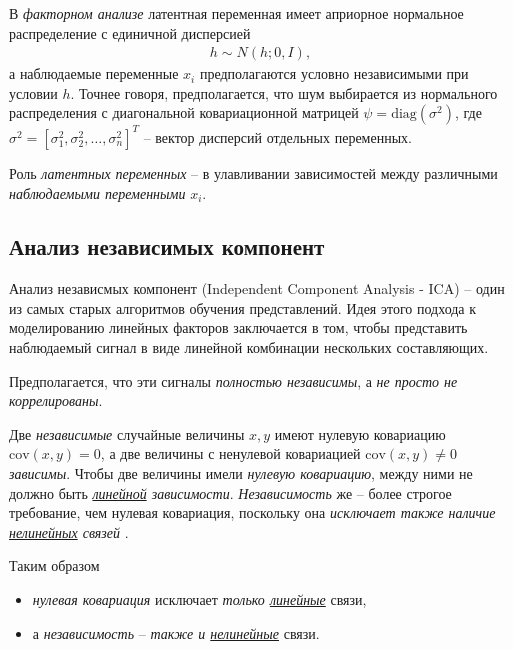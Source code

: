 \documentclass[%
	11pt,
	a4paper,
	utf8,
]{article}
\begin{document}
В \emph{факторном анализе} латентная переменная имеет априорное нормальное распределение с единичной дисперсией
\begin{align*}
	h \sim N(h; 0, I),
\end{align*}
а наблюдаемые переменные $ x_i $ предполагаются условно независимыми при условии $ h $. Точнее говоря, предполагается, что шум выбирается из нормального распределения с диагональной ковариационной матрицей $ \psi = \text{diag} (\sigma^2) $, где $ \sigma^2 = [\sigma_1^2, \sigma_2^2, \ldots, \sigma_n^2]^T $ -- вектор дисперсий отдельных переменных.

Роль \emph{латентных переменных} -- в улавливании зависимостей между различными \emph{наблюдаемыми переменными} $ x_i $.

\subsection{Анализ независимых компонент}

Анализ независмых компонент (Independent Component Analysis - ICA) -- один из самых старых алгоритмов обучения представлений. Идея этого подхода к моделированию линейных факторов заключается в том, чтобы представить наблюдаемый сигнал в виде линейной комбинации нескольких составляющих.

Предполагается, что эти сигналы \emph{полностью независимы}, а \emph{не просто не коррелированы}.

Две \emph{независимые} случайные величины $ x, y $ имеют нулевую ковариацию $ \text{cov}(x, y) = 0 $, а две величины с ненулевой ковариацией $ \text{cov}(x, y) \neq 0 $ \emph{зависимы}. {\color{blue}Чтобы две величины имели \emph{нулевую ковариацию}, между ними не должно быть \emph{\underline{линейной} зависимости}. \emph{Независимость} же -- более строгое требование, чем нулевая ковариация, поскольку она \emph{исключает также наличие \underline{нелинейных} связей}} \cite[]{goodfellow:ml-2018}.

Таким образом
\begin{itemize}
	\item \emph{нулевая ковариация} исключает \emph{только \underline{линейные}} связи,
	
	\item а \emph{независимость} -- \emph{также и \underline{нелинейные}} связи.
\end{itemize}
\end{document}
